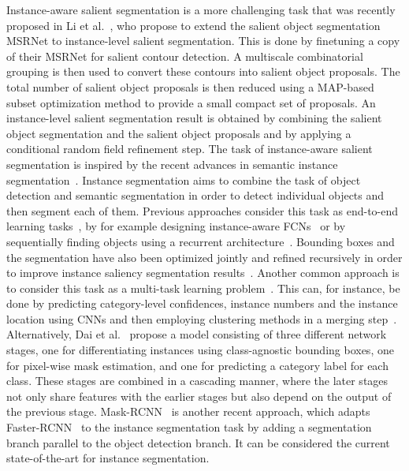 \documentclass[journal]{IEEEtran}
\begin{document}
Instance-aware salient segmentation is a more challenging task that was recently proposed in Li et al.~\cite{li2017instance}, who propose to extend the salient object segmentation MSRNet to instance-level salient segmentation. This is done by finetuning a copy of their MSRNet for salient contour detection. A multiscale combinatorial grouping is then used to convert these contours into salient object proposals. The total number of salient object proposals is then reduced using a MAP-based subset optimization method to provide a small compact set of proposals. An instance-level salient segmentation result is obtained by combining the salient object segmentation and the salient object proposals and by applying a conditional random field refinement step.
The task of instance-aware salient segmentation is inspired by the recent advances in semantic instance segmentation~\cite{hariharan2014simultaneous,romera2016recurrent,dai2016instance,dai2016instance2}. Instance segmentation aims to combine the task of object detection and semantic segmentation in order to detect individual objects and then segment each of them. Previous approaches consider this task as end-to-end learning tasks~\cite{romera2016recurrent,dai2016instance}, by for example designing instance-aware FCNs~\cite{dai2016instance} or by sequentially finding objects using a recurrent architecture~\cite{romera2016recurrent}. Bounding boxes and the segmentation have also been optimized jointly and refined recursively in order to improve instance saliency segmentation results~\cite{liang2016reversible}.
Another common approach is to consider this task as a multi-task learning problem~\cite{liang2015proposal,dai2016instance2,hariharan2014simultaneous}. This can, for instance, be done by predicting category-level confidences, instance numbers and the instance location using CNNs and then employing clustering methods in a merging step~\cite{liang2015proposal}. Alternatively, Dai et al.~\cite{dai2016instance2} propose a model consisting of three different network stages, one for differentiating instances using class-agnostic bounding boxes, one for pixel-wise mask estimation, and one for predicting a category label for each class. These stages are combined in a cascading manner, where the later stages not only share features with the earlier stages but also depend on the output of the previous stage.
Mask-RCNN~\cite{he2017mask} is another recent approach, which adapts Faster-RCNN~\cite{ren2017faster} to the instance segmentation task by adding a segmentation branch parallel to the object detection branch. It can be considered the current state-of-the-art for instance segmentation.
\end{document}
